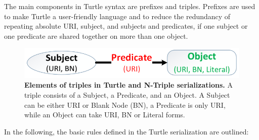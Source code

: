 The main components in Turtle syntax are prefixes and triples. 
Prefixes are used to make Turtle a user-friendly language and to reduce the redundancy of repeating absolute URI, subject, and subjects and predicates, if one subject or one predicate are shared together on more than one object. 

\begin{figure}[ht]
	\begin{center}
		\includegraphics[scale=0.4,angle=0]{images/TurtleandNtripleElements.png}
				\setlength\belowcaptionskip{-5mm}
		\caption{\textbf{ Elements of triples in Turtle and N-Triple serializations.} A triple consists of a Subject, a Predicate, and an Object. A Subject can be either URI or Blank Node (BN), a Predicate is only URI, while an Object can take URI, BN or Literal forms.}
		\label{Fig:TurtleandNtripleElements}
	\end{center}
\end{figure}

In the following, the basic rules defined in the Turtle serialization are outlined:

